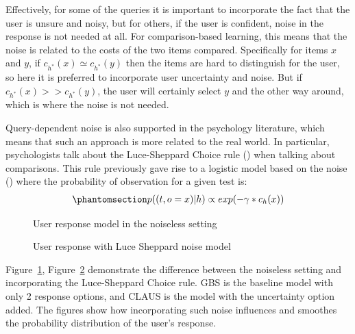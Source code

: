 \documentclass[
  letterpaper,
  numbers=noenddot,
  DIV=11]{scrreprt}
\theoremstyle{plain}
\theoremstyle{definition}
\theoremstyle{plain}
\theoremstyle{remark}
\begin{document}
Effectively, for some of the queries it is important to incorporate the
fact that the user is unsure and noisy, but for others, if the user is
confident, noise in the response is not needed at all. For
comparison-based learning, this means that the noise is related to the
costs of the two items compared. Specifically for items \(x\) and \(y\),
if \(c_{h^*}(x) \simeq c_{h^*}(y)\) then the items are hard to
distinguish for the user, so here it is preferred to incorporate user
uncertainty and noise. But if \(c_{h^*}(x) >> c_{h^*}(y)\), the user
will certainly select \(y\) and the other way around, which is where the
noise is not needed.

Query-dependent noise is also supported in the psychology literature,
which means that such an approach is more related to the real world. In
particular, psychologists talk about the Luce-Sheppard Choice rule
() when talking about comparisons.
This rule previously gave rise to a logistic model based on the noise
() where the
probability of observation for a given test is:
\begin{equation}\phantomsection\label{eq-noise_model}{\begin{aligned}
    p((t, o = x) | h) \propto exp(-\gamma * c_h(x))
\end{aligned}}\end{equation}

\begin{figure}


\caption{\label{fig-noiseless_1}User response model in the noiseless
setting}

\end{figure}%

\begin{figure}


\caption{\label{fig-noiseless_2}User response with Luce Sheppard noise
model}

\end{figure}%

Figure~\ref{fig-noiseless_1}, Figure~\ref{fig-noiseless_2} demonstrate
the difference between the noiseless setting and incorporating the
Luce-Sheppard Choice rule. GBS is the baseline model with only 2
response options, and CLAUS is the model with the uncertainty option
added. The figures show how incorporating such noise influences and
smoothes the probability distribution of the user's response.
\end{document}
